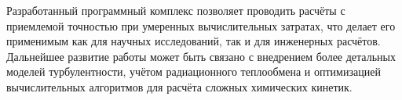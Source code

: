 Разработанный программный комплекс позволяет проводить расчёты с приемлемой точностью при умеренных вычислительных затратах, что делает его применимым как для научных исследований, так и для инженерных расчётов. Дальнейшее развитие работы может быть связано с внедрением более детальных моделей турбулентности, учётом радиационного теплообмена и оптимизацией вычислительных алгоритмов для расчёта сложных химических кинетик.
